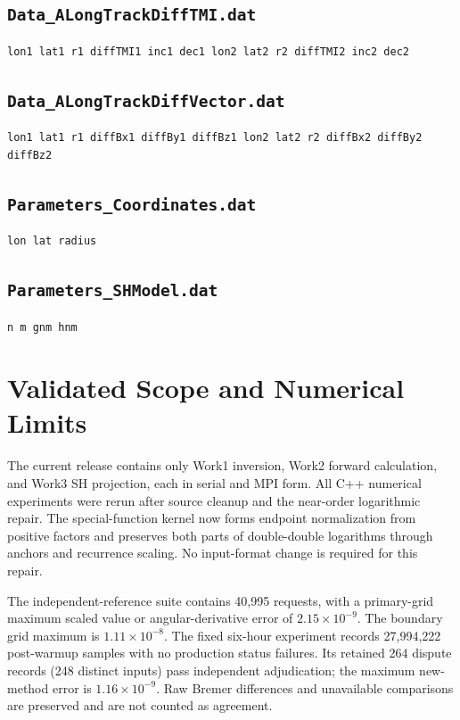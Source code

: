 \documentclass[11pt,a4paper]{article}
\begin{document}
\subsection*{\texttt{Data\_ALongTrackDiffTMI.dat}}
\begin{lstlisting}[style=plaincode]
lon1 lat1 r1 diffTMI1 inc1 dec1 lon2 lat2 r2 diffTMI2 inc2 dec2
\end{lstlisting}

\subsection*{\texttt{Data\_ALongTrackDiffVector.dat}}
\begin{lstlisting}[style=plaincode]
lon1 lat1 r1 diffBx1 diffBy1 diffBz1 lon2 lat2 r2 diffBx2 diffBy2 diffBz2
\end{lstlisting}

\subsection*{\texttt{Parameters\_Coordinates.dat}}
\begin{lstlisting}[style=plaincode]
lon lat radius
\end{lstlisting}

\subsection*{\texttt{Parameters\_SHModel.dat}}
\begin{lstlisting}[style=plaincode]
n m gnm hnm
\end{lstlisting}

\section{Validated Scope and Numerical Limits}

The current release contains only Work1 inversion, Work2 forward
calculation, and Work3 SH projection, each in serial and MPI form.
All C++ numerical experiments were rerun after source cleanup and the
near-order logarithmic repair. The special-function kernel now forms
endpoint normalization from positive factors and preserves both parts
of double-double logarithms through anchors and recurrence scaling.
No input-format change is required for this repair.

The independent-reference suite contains 40,995 requests, with a
primary-grid maximum scaled value or angular-derivative error of
$2.15\times10^{-9}$. The boundary grid maximum is $1.11\times10^{-8}$.
The fixed six-hour experiment records 27,994,222
post-warmup samples with no production status failures. Its retained
264 dispute records (248
distinct inputs) pass independent adjudication; the maximum new-method
error is $1.16\times10^{-9}$. Raw Bremer differences
and unavailable comparisons are preserved and are not counted as agreement.
\end{document}

